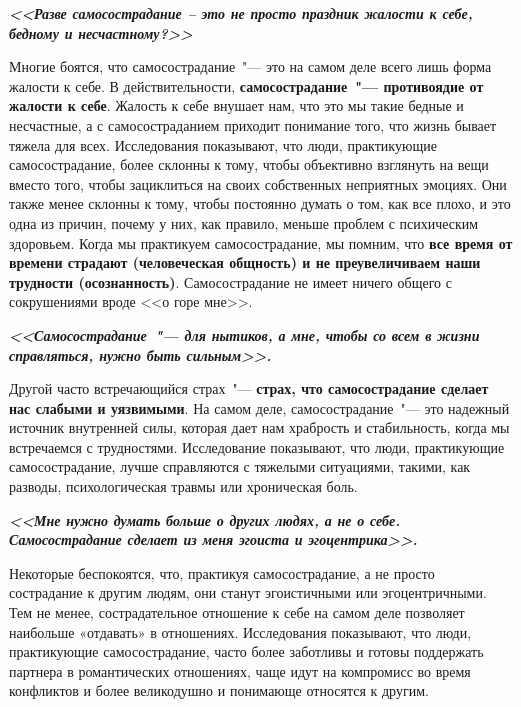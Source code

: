\textbf{\textit{<<Разве самосострадание – это не просто праздник жалости к себе, бедному и несчастному?>>}}

\vspace{2ex}

Многие боятся, что самосострадание~"--- это на самом деле всего лишь форма жалости к себе. В действительности,\textbf{ самосострадание~"--- противоядие от жалости к себе}. Жалость к себе внушает нам, что это мы такие бедные и несчастные, а с самосостраданием приходит понимание того, что жизнь бывает тяжела для всех. Исследования показывают, что люди, практикующие самосострадание, более склонны к тому, чтобы объективно взглянуть на вещи вместо того, чтобы зациклиться на своих собственных неприятных эмоциях. Они также менее склонны к тому, чтобы постоянно думать о том, как все плохо, и это одна из причин, почему у них, как правило, меньше проблем с психическим здоровьем. Когда мы практикуем самосострадание, мы помним, что \textbf{все время от времени страдают (человеческая общность) и не преувеличиваем наши трудности (осознанность)}. Самосострадание не имеет ничего общего с сокрушениями вроде <<о горе мне>>. 

\vspace{4ex}

\textbf{\textit{<<Самосострадание~"--- для нытиков, а мне, чтобы со всем в жизни справляться, нужно быть сильным>>.}}

\vspace{2ex}

Другой часто встречающийся страх~"--- \textbf{страх, что самосострадание сделает нас слабыми и уязвимыми}. На самом деле, самосострадание~"--- это надежный источник внутренней силы, которая дает нам храбрость и стабильность, когда мы встречаемся с трудностями. Исследование показывают, что люди, практикующие самосострадание, лучше справляются с тяжелыми ситуациями, такими, как разводы, психологическая травмы или хроническая боль.

\vspace{4ex}

\textbf{\textit{<<Мне нужно думать больше о других людях, а не о себе. Самосострадание сделает из меня эгоиста и эгоцентрика>>.}}

\vspace{2ex}

Некоторые беспокоятся, что, практикуя самосострадание, а не просто сострадание к другим людям, они станут эгоистичными или эгоцентричными. Тем не менее, сострадательное отношение к себе на самом деле позволяет наибольше «отдавать» в отношениях. Исследования показывают, что люди, практикующие самосострадание, часто более заботливы и готовы поддержать партнера в романтических отношениях, чаще идут на компромисс во время конфликтов и более великодушно и понимающе относятся к другим. 

